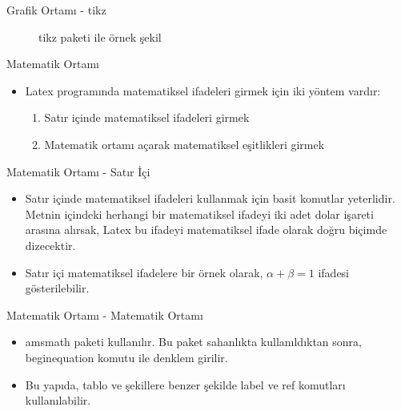 \documentclass[pdf]{beamer}
\begin{document}
\begin{frame}{Grafik Ortamı - tikz}
\begin{figure}[h!]
	\begin{center}
		\caption{tikz paketi ile örnek şekil}
	\end{center}
\end{figure}
\end{frame}

\begin{frame}{Matematik Ortamı}
\begin{itemize}
	\item Latex programında matematiksel ifadeleri girmek için iki yöntem vardır:
	\begin{enumerate}
		\item Satır içinde matematiksel ifadeleri girmek
		\item Matematik ortamı açarak matematiksel eşitlikleri girmek
	\end{enumerate}
\end{itemize}
\end{frame}

\begin{frame}{Matematik Ortamı - Satır İçi}
\begin{itemize}
	\item Satır içinde matematiksel ifadeleri kullanmak için basit komutlar yeterlidir. Metnin içindeki herhangi bir matematiksel ifadeyi iki adet dolar işareti arasına alırsak, Latex bu ifadeyi matematiksel ifade olarak doğru biçimde dizecektir.
	\item Satır içi matematiksel ifadelere bir örnek olarak, $\alpha + \beta = 1$ ifadesi gösterilebilir.
\end{itemize}
\end{frame}

\begin{frame}{Matematik Ortamı - Matematik Ortamı}
\begin{itemize}
	\item amsmath paketi kullanılır. Bu paket sahanlıkta kullanıldıktan sonra, begin{equation} komutu ile denklem girilir.
	\item Bu yapıda, tablo ve şekillere benzer şekilde label ve ref komutları kullanılabilir.
\end{itemize}
\end{frame}
\end{document}
